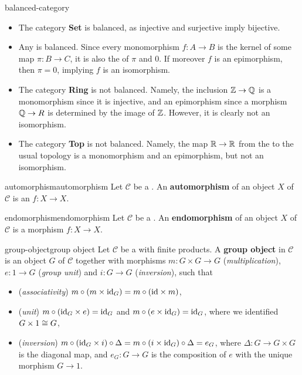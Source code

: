 \begin{example}{balanced-category}
    \begin{itemize}
        \item The category \textbf{Set} is balanced, as injective and surjective imply bijective.
        
        \item Any  is balanced. Since every monomorphism $f : A \to B$ is the kernel of some map $\pi : B \to C$, it is also the  of $\pi$ and $0$. If moreover $f$ is an epimorphism, then $\pi = 0$, implying $f$ is an isomorphism.
    
        \item The category \textbf{Ring} is not balanced. Namely, the inclusion $\mathbb{Z} \to \mathbb{Q}$ is a monomorphism since it is injective, and an epimorphism since a morphism $\mathbb{Q} \to R$ is determined by the image of $\mathbb{Z}$. However, it is clearly not an isomorphism.
    
        \item The category \textbf{Top} is not balanced. Namely, the map $\mathbb{R} \to \mathbb{R}$ from the  to the usual topology is a monomorphism and an epimorphism, but not an isomorphism.
    \end{itemize}
\end{example}

\begin{topic}{automorphism}{automorphism}
    Let $\mathcal{C}$ be a . An \textbf{automorphism} of an object $X$ of $\mathcal{C}$ is an  $f : X \to X$.
\end{topic}

\begin{topic}{endomorphism}{endomorphism}
    Let $\mathcal{C}$ be a . An \textbf{endomorphism} of an object $X$ of $\mathcal{C}$ is a morphism $f : X \to X$.
\end{topic}

\begin{topic}{group-object}{group object}
    Let $\mathcal{C}$ be a  with finite products. A \textbf{group object} in $\mathcal{C}$ is an object $G$ of $\mathcal{C}$ together with morphisms $m : G \times G \to G$ (\textit{multiplication}), $e : 1 \to G$ (\textit{group unit}) and $i : G \to G$ (\textit{inversion}), such that
    \begin{itemize}
        \item (\textit{associativity}) $m \circ (m \times \textup{id}_G) = m \circ (\textup{id} \times m)$,
        \item (\textit{unit}) $m \circ (\textup{id}_G \times e) = \textup{id}_G$ and $m \circ (e \times \textup{id}_G) = \textup{id}_G$, where we identified $G \times 1 \cong G$,
        \item (\textit{inversion}) $m \circ (\textup{id}_G \times i) \circ \Delta = m \circ (i \times \textup{id}_G) \circ \Delta = e_G$, where $\Delta : G \to G \times G$ is the diagonal map, and $e_G : G \to G$ is the composition of $e$ with the unique morphism $G \to 1$.
    \end{itemize}
\end{topic}

